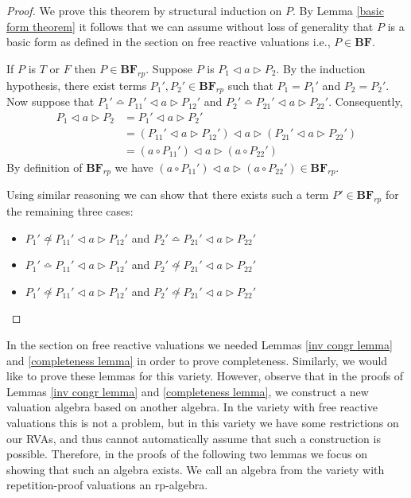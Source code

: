 \documentclass[a4paper,twoside,openright]{report}
\newcommand{\BF}{\ensuremath{\textbf{BF}}}
\newcommand{\syn}{\bumpeq}
\newcommand{\nsyn}{\not\bumpeq}
\newcommand{\lef}{\ensuremath{\triangleleft}}
\newcommand{\rig}{\ensuremath{\triangleright}}
\begin{document}
\begin{proof}
We prove this theorem by structural induction on $P$. By Lemma \ref{basic form theorem} it follows that we can assume without loss of generality that $P$ is a basic form as defined in the section on free reactive valuations i.e., $P\in\BF$.

If $P$ is $T$ or $F$ then $P\in\BF_{rp}$. Suppose $P$ is $P_1\lef a\rig P_2$. By the induction hypothesis,
there exist terms $P_1',P_2'\in\BF_{rp}$ such that $P_1=P_1'$
and $P_2=P_2'$. Now suppose that $P_1'\syn P_{11}'\lef a\rig
P_{12}'$ and $P_2'\syn P_{21}'\lef a\rig P_{22}'$. Consequently,
\begin{align*}
P_1\lef a\rig P_2
&= P_1'\lef a\rig P_2'\\
&= (P_{11}'\lef a\rig P_{12}')\lef a\rig (P_{21}'\lef a\rig P_{22}')\\
&= (a\circ P_{11}')\lef a\rig (a\circ P_{22}')
\end{align*}
By definition of $\BF_{rp}$ we have $(a\circ P_{11}')\lef a\rig
(a\circ P_{22}')\in\BF_{rp}$.

Using similar reasoning we can show that there exists such a term
$P'\in\BF_{rp}$ for the remaining three cases:
\begin{itemize}
\item $P_1'\nsyn P_{11}'\lef a\rig P_{12}'$ and $P_2'\syn P_{21}'\lef a\rig P_{22}'$
\item $P_1'\syn P_{11}'\lef a\rig P_{12}'$ and $P_2'\nsyn P_{21}'\lef a\rig P_{22}'$
\item $P_1'\nsyn P_{11}'\lef a\rig P_{12}'$ and $P_2'\nsyn P_{21}'\lef a\rig P_{22}'$
\end{itemize}
\end{proof}

In the section on free reactive valuations we needed Lemmas \ref{inv congr lemma} and \ref{completeness lemma} in order to prove completeness. Similarly, we would like to prove these lemmas for this variety. However, observe that in the proofs of Lemmas \ref{inv congr lemma} and \ref{completeness lemma}, we construct a new valuation algebra based on another algebra. In the variety with free reactive valuations this is not a problem, but in this variety we have some restrictions on our RVAs, and thus cannot automatically assume that such a construction is possible. Therefore, in the proofs of the following two lemmas we focus on showing that such an algebra exists. We call an algebra from the variety with repetition-proof valuations an rp-algebra.
\end{document}
